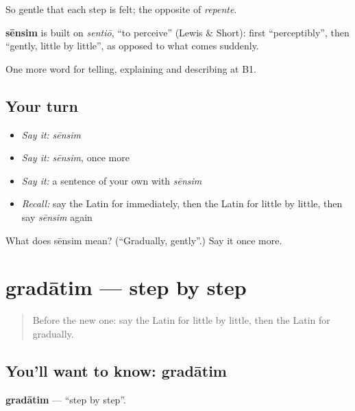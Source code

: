 So gentle that each step is felt; the opposite of \emph{repente}.

\begin{cousinweb}
\textbf{sēnsim} is built on \emph{sentiō}, \textquotedblleft{}to perceive\textquotedblright{} (Lewis \& Short): first \textquotedblleft{}perceptibly\textquotedblright{}, then \textquotedblleft{}gently, little by little\textquotedblright{}, as opposed to what comes suddenly.
\end{cousinweb}

\begin{grammarlens}[title={What you've built}]
One more word for telling, explaining and describing at B1.
\end{grammarlens}

\subsection*{Your turn}
\begin{itemize}
\raggedright
  \item \emph{Say it:} \emph{sēnsim}
  \item \emph{Say it:} \emph{sēnsim}, once more
  \item \emph{Say it:} a sentence of your own with \emph{sēnsim}
  \item \emph{Recall:} say the Latin for immediately, then the Latin for little by little, then say \emph{sēnsim} again
\end{itemize}

\begin{tcolorbox}[breakable,colback=teal!4,colframe=teal!35!black,title={Before you move on}]
What does sēnsim mean? (\textquotedblleft{}Gradually, gently\textquotedblright{}.) Say it once more.
\end{tcolorbox}
\section[gradātim]{gradātim — step by step}

\label{lesson:LA-C293-gradatim}



\begin{quote}
Before the new one: say the Latin for little by little, then the Latin for gradually.
\end{quote}

\subsection*{You'll want to know: gradātim}
\textbf{gradātim} — \textquotedblleft{}step by step\textquotedblright{}.

